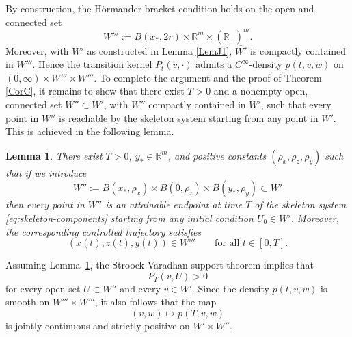 \documentclass[11pt, a4paper,leqno]{amsart}
\newtheorem{lemma}{Lemma}[section]
\theoremstyle{definition}
\numberwithin{equation}{section}
\begin{document}
By construction, the Hörmander bracket condition holds on the open and connected set
\[
W''':=B(x_\ast,2r)\times \mathbb R^m\times (\mathbb R_+)^m .
\]
Moreover, with $W'$ as constructed in Lemma \ref{LemJ1},  \(\overline{W'}\) is compactly contained in \(W'''\).
Hence the transition kernel \(P_t(v,\cdot)\) admits a \(C^\infty\)-density $p(t,v,w)$
on \((0,\infty)\times W'''\times W'''\). To complete the argument and the proof of Theorem \ref{CorC}, it remains to show that there exist \(T>0\) and
a nonempty open, connected set \(W''\subset W'\), with \(\overline{W''}\)
compactly contained in \(W'\), such that every point in \(W''\) is reachable
by the skeleton system starting from any point in \(W'\).
This is achieved in the following lemma.

\begin{lemma}\label{lem:access-xzy-openV-3stagefinal}
There exist \(T>0\), \(y_\ast\in\mathbb R^m\), and positive constants
\((\rho_x,\rho_z,\rho_y)\) such that if we introduce
\[
W'' :=
B(x_\ast,\rho_x)\times B(0,\rho_z)\times B(y_\ast,\rho_y)
\subset W'
\]
then every point in \(W''\) is an attainable
endpoint at time \(T\) of the skeleton system \eqref{eq:skeleton-components}
starting from any initial condition \(U_0\in W'\). Moreover, the corresponding controlled trajectory satisfies
\[
(x(t),z(t),y(t))\in W'''
\qquad \text{for all } t\in[0,T].
\]
\end{lemma}

Assuming Lemma~\ref{lem:access-xzy-openV-3stagefinal}, the Stroock-Varadhan
support theorem implies that
\[
P_T(v,U)>0
\]
for every open set \(U\subset W''\) and every \(v\in W'\).
Since the density \(p(t,v,w)\) is smooth on \(W'''\times W'''\), it also follows
that the map
\[
(v,w)\mapsto p(T,v,w)
\]
is jointly continuous and strictly positive on \(W'\times W''\).
\end{document}
